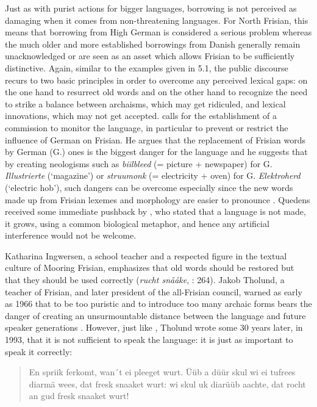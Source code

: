 \documentclass[output=paper]{langsci/langscibook}
\begin{document}
Just as with purist actions for bigger languages, borrowing is not perceived as damaging when it comes from non-threatening languages. For North Frisian, this means that borrowing from High German is considered a serious problem whereas the much older and more established borrowings from Danish generally remain unacknowledged or are seen as an asset which allows Frisian to be sufficiently distinctive. Again, similar to the examples given in 5.1, the public discourse recurs to two basic principles in order to overcome any perceived lexical gaps: on the one hand to resurrect old words and on the other hand to recognize the need to strike a balance between archaisms, which may get ridiculed, and lexical innovations, which may not get accepted. \citet{Quedens1967} calls for the establishment of a commission to monitor the language, in particular to prevent or restrict the influence of German on Frisian. He argues that the replacement of Frisian words by German (G.) ones is the biggest danger for the language and he suggests that by creating neologisms such as \textit{biilbleed} (= picture + newspaper) for G. \textit{Illustrierte} (‘magazine’) or \textit{struumonk} (= electricity + oven) for G. \textit{Elektroherd} (‘electric hob’), such dangers can be overcome especially since the new words made up from Frisian lexemes and morphology are easier to pronounce \citep[95]{Quedens1967}. Quedens received some immediate pushback by \citet{Preisler1968}, who stated that a language is not made, it grows, using a common biological metaphor, and hence any artificial interference would not be welcome.

Katharina Ingwersen, a school teacher and a respected figure in the textual culture of Mooring Frisian, emphasizes that old words should be restored but that they should be used correctly (\textit{rucht snååke}, \citealt{Ingwersen1966}: 264). Jakob Tholund, a teacher of Frisian, and later president of the all-Frisian council, warned as early as 1966 that to be too puristic and to introduce too many archaic forms bears the danger of creating an unsurmountable distance between the language and future speaker generations \citep[31]{Tholund1966}. However, just like \citet{Ingwersen1966}, Tholund wrote some 30 years later, in 1993, that it is not sufficient to speak the language: it is just as important to speak it correctly: 

\begin{quote}
En spriik ferkomt, wan´t ei pleeget wurt. Üüb a düür skul wi ei tufrees diarmä wees, dat fresk snaaket wurt: wi skul uk diarüüb aachte, dat rocht an gud fresk snaaket wurt! \citep[17]{Tholund1993}
\end{quote}
\end{document}
